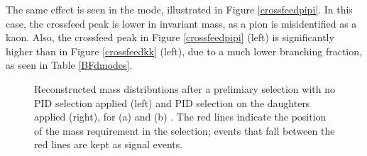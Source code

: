 The same effect is seen in the \pipi mode, illustrated in Figure \ref{crossfeedpipi}. In this case, the crossfeed peak is lower in invariant mass, as a pion is misidentified as a kaon. Also, the crossfeed peak in Figure \ref{crossfeedpipi} (left) is significantly higher than in Figure \ref{crossfeedkk} (left), due to a much lower \decay{\Dz}{\pip\pim} branching fraction, as seen in Table \ref{BFdmodes}.

\begin{figure}
\hfill
{}
\caption{Reconstructed \Dz mass distributions after a prelimiary selection with no PID selection applied (left) and PID selection on the \Dz daughters applied (right), for (a) \kk and (b) \pipi. The red lines indicate the position of the \Dz mass requirement in the selection; events that fall between the red lines are kept as signal events.}
\label{fig:crossfeed}
\end{figure}

